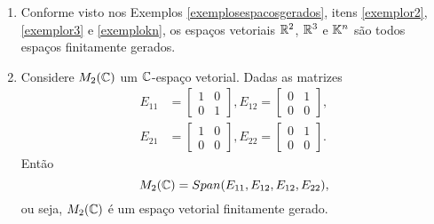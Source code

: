 \begin{exemplos}
    \begin{enumerate}
        \item Conforme visto nos Exemplos \ref{exemplosespacosgerados}, itens \ref{exemplor2}, \ref{exemplor3} e \ref{exemplokn}, os espaços vetoriais $\mathbb{R}^2$, $\mathbb{R}^3$ e $\mathbb{K}^n$ são todos espaços finitamente gerados.

        \item Considere $M_2(\mathbb{C})$ um $\mathbb{C}$-espaço vetorial. Dadas as matrizes
        \begin{align*}
            E_{11} &= \begin{bmatrix}1 & 0\\0 & 1\end{bmatrix},
            E_{12} = \begin{bmatrix}0 & 1\\0 &0 \end{bmatrix},\\
            E_{21} &= \begin{bmatrix}1 & 0\\0 & 0\end{bmatrix},
            E_{22} = \begin{bmatrix}0 & 1\\0 & 0\end{bmatrix}.
        \end{align*}
        Então
        \[
            M_2(\mathbb{C}) = Span(E_{11}, E_{12}, E_{12}, E_{22}),
        \]
        ou seja, $M_2(\mathbb{C})$ é um espaço vetorial finitamente gerado.


\end{enumerate}
\end{exemplos}
